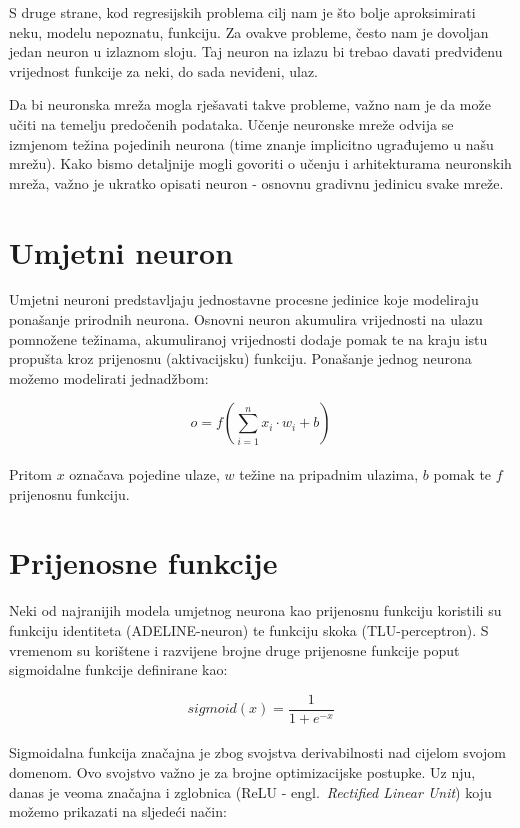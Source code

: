 \documentclass[times, utf8, zavrsni, numeric]{fer}
\begin{document}
S druge strane, kod regresijskih problema cilj nam je što bolje aproksimirati neku, modelu nepoznatu, funkciju. Za ovakve probleme, često nam je dovoljan jedan neuron u izlaznom sloju. 
Taj neuron na izlazu bi trebao davati predviđenu vrijednost funkcije za neki, do sada neviđeni, ulaz.

Da bi neuronska mreža mogla rješavati takve probleme, važno nam je da može učiti na temelju predočenih podataka. Učenje neuronske mreže odvija se izmjenom težina pojedinih neurona (time znanje implicitno ugrađujemo u našu mrežu).
Kako bismo detaljnije mogli govoriti o učenju i arhitekturama neuronskih mreža, važno je ukratko opisati neuron - osnovnu gradivnu jedinicu svake mreže.
\pagebreak
\section{Umjetni neuron}
Umjetni neuroni predstavljaju jednostavne procesne jedinice koje modeliraju ponašanje prirodnih neurona. Osnovni neuron akumulira vrijednosti na ulazu pomnožene težinama, 
akumuliranoj vrijednosti dodaje pomak te na kraju istu propušta kroz prijenosnu (aktivacijsku) funkciju. Ponašanje jednog neurona možemo modelirati jednadžbom:

\begin{equation}
    o = f(\sum_{i=1}^{n}x_{i} \cdot w_{i} + b)
    \label{eq:neuron}
\end{equation}
\\
\noindent Pritom $x$ označava pojedine ulaze, $w$ težine na pripadnim ulazima, $b$ pomak te $f$ prijenosnu funkciju. 

\section{Prijenosne funkcije}
Neki od najranijih modela umjetnog neurona kao prijenosnu funkciju koristili su funkciju identiteta (ADELINE-neuron) te funkciju skoka (TLU-perceptron).
S vremenom su korištene i razvijene brojne druge prijenosne funkcije poput sigmoidalne funkcije definirane kao:

\begin{equation}
    sigmoid(x) = \frac{1}{1 + e^{-x}}
    \label{eq:sigmoid}
\end{equation}
\\
Sigmoidalna funkcija značajna je zbog svojstva derivabilnosti nad cijelom svojom domenom. Ovo svojstvo važno je za brojne optimizacijske postupke.
Uz nju, danas je veoma značajna i zglobnica (ReLU - engl.\ \textit{Rectified Linear Unit}) koju možemo prikazati na sljedeći način:
\end{document}
